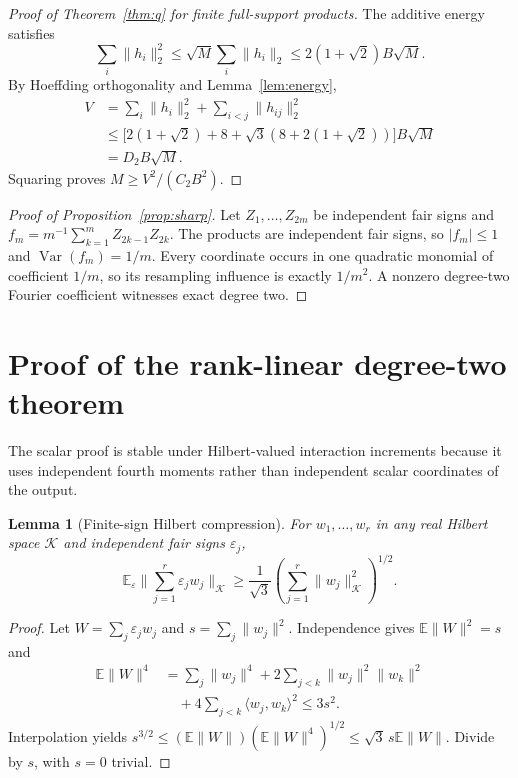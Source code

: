 \documentclass[11pt,letterpaper]{article}
\newtheorem{lemma}[theorem]{Lemma}
\theoremstyle{definition}
\newcommand{\E}{\mathbb E}
\newcommand{\Var}{\operatorname{Var}}
\newcommand{\cK}{\mathcal K}
\newcommand{\Ctwo}{C_2}
\newcommand{\abs}[1]{\lvert #1\rvert}
\newcommand{\norm}[1]{\lVert #1\rVert}
\begin{document}
\begin{proof}[Proof of Theorem~\ref{thm:q} for finite full-support products]
The additive energy satisfies
\[\sum_i\norm{h_i}_2^2\le\sqrt M\sum_i\norm{h_i}_2\le2(1+\sqrt2)B\sqrt M.\]
By Hoeffding orthogonality and Lemma~\ref{lem:energy},
\[
\begin{aligned}
V&=\sum_i\norm{h_i}_2^2+\sum_{i<j}\norm{h_{ij}}_2^2\\
&\le\bigl[2(1+\sqrt2)+8+\sqrt3(8+2(1+\sqrt2))\bigr]B\sqrt M\\
&=D_2B\sqrt M.
\end{aligned}
\]
Squaring proves $M\ge V^2/(\Ctwo B^2)$.
\end{proof}

\begin{proof}[Proof of Proposition~\ref{prop:sharp}]
Let $Z_1,\ldots,Z_{2m}$ be independent fair signs and $f_m=m^{-1}\sum_{k=1}^m Z_{2k-1}Z_{2k}$. The products are independent fair signs, so $\abs{f_m}\le1$ and $\Var(f_m)=1/m$. Every coordinate occurs in one quadratic monomial of coefficient $1/m$, so its resampling influence is exactly $1/m^2$. A nonzero degree-two Fourier coefficient witnesses exact degree two.
\end{proof}

\section{Proof of the rank-linear degree-two theorem}\label{sec:rank}
The scalar proof is stable under Hilbert-valued interaction increments because it uses independent fourth moments rather than independent scalar coordinates of the output.

\begin{lemma}[Finite-sign Hilbert compression]\label{lem:sign}
For $w_1,\ldots,w_r$ in any real Hilbert space $\cK$ and independent fair signs $\varepsilon_j$,
\begin{equation}\label{eq:sign}
\E_\varepsilon\norm{\sum_{j=1}^r\varepsilon_jw_j}_{\cK}
\ge\frac{1}{\sqrt3}\left(\sum_{j=1}^r\norm{w_j}_{\cK}^2\right)^{1/2}.
\end{equation}
\end{lemma}
\begin{proof}
Let $W=\sum_j\varepsilon_jw_j$ and $s=\sum_j\norm{w_j}^2$. Independence gives $\E\norm W^2=s$ and
\[\begin{aligned}
\E\norm W^4&=\sum_j\norm{w_j}^4+2\sum_{j<k}\norm{w_j}^2\norm{w_k}^2\\
&\quad+4\sum_{j<k}\langle w_j,w_k\rangle^2\le3s^2.
\end{aligned}\]
Interpolation yields $s^{3/2}\le(\E\norm W)(\E\norm W^4)^{1/2}\le\sqrt3\,s\E\norm W$. Divide by $s$, with $s=0$ trivial.
\end{proof}
\end{document}
